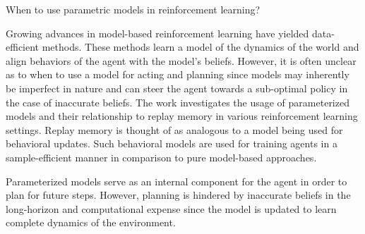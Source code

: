 \documentclass[11pt,letterpaper]{article}
\begin{document}
\begin{center}
  \large{ When to use parametric models in reinforcement learning?}
\end{center}

Growing advances in model-based reinforcement learning have yielded data-efficient methods. These methods learn a model of the dynamics of the world and align behaviors of the agent with the model's beliefs. However, it is often unclear as to when to use a model for acting and planning since models may inherently be imperfect in nature and can steer the agent towards a sub-optimal policy in the case of inaccurate beliefs. The work investigates the usage of parameterized models and their relationship to replay memory in various reinforcement learning settings. Replay memory is thought of as analogous to a model being used for behavioral updates. Such behavioral models are used for training agents in a sample-efficient manner in comparison to pure model-based approaches.

Parameterized models serve as an internal component for the agent in order to plan for future steps. However, planning is hindered by inaccurate beliefs in the long-horizon and computational expense since the model is updated to learn complete dynamics of the environment. 
\end{document}
